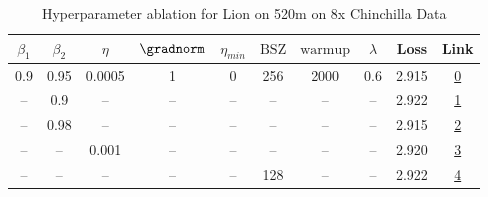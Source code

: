 \begin{table}[H]
\centering
\caption{Hyperparameter ablation for Lion on 520m on 8x Chinchilla Data}
\label{tab:ablation_lion_520m_on_8x_chinchilla_data}
\begin{tabular}{cccccccccc}
\toprule
$\beta_1$ & $\beta_2$ & $\eta$ & $\gradnorm$ & $\eta_{min}$ & $\mathrm{BSZ}$ & $\mathrm{warmup}$ & $\lambda$ & Loss & Link \\
\midrule
0.9 & 0.95 & 0.0005 & 1 & 0 & 256 & 2000 & 0.6 & 2.915 & \href{https://wandb.ai/stanford-mercury/optimizer-scaling/runs/sweep-520m-85B-lionf86a38lr0.0005-wd0.6-minlr0-warmup2000-b10.9--54ea21}{0} \\
\midrule
-- & 0.9 & -- & -- & -- & -- & -- & -- & 2.922 & \href{https://wandb.ai/stanford-mercury/optimizer-scaling/runs/sweep-520m-85B-lion75027blr0.0005-wd0.6-minlr0-warmup2000-b10.9--094576}{1} \\
-- & 0.98 & -- & -- & -- & -- & -- & -- & 2.915 & \href{https://wandb.ai/stanford-mercury/optimizer-scaling/runs/sweep-520m-85B-lion1c2a3blr0.0005-wd0.6-minlr0-warmup2000-b10.9--fdc97c}{2} \\
-- & -- & 0.001 & -- & -- & -- & -- & -- & 2.920 & \href{https://wandb.ai/stanford-mercury/optimizer-scaling/runs/sweep-520m-85B-lion2b623elr0.001-wd0.6-minlr0-warmup2000-b10.9-b-a6a1ef}{3} \\
-- & -- & -- & -- & -- & 128 & -- & -- & 2.922 & \href{https://wandb.ai/stanford-mercury/optimizer-scaling/runs/sweep-520m-85B-liond118d4lr0.0005-wd0.6-minlr0-warmup2000-b10.9--8f527b}{4} \\
\bottomrule
\end{tabular}
\end{table}

